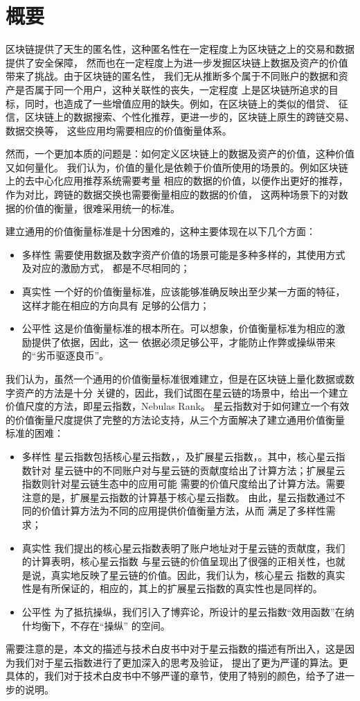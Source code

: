 \section{概要}


区块链提供了天生的匿名性，这种匿名性在一定程度上为区块链之上的交易和数据提供了安全保障，
然而也在一定程度上为进一步发掘区块链上数据及资产的价值带来了挑战。由于区块链的匿名性，
我们无从推断多个属于不同账户的数据和资产是否属于同一个用户，这种关联性的丧失，一定程度
上是区块链所追求的目标，同时，也造成了一些增值应用的缺失。例如，在区块链上的类似的借贷、
征信，区块链上的数据搜索、个性化推荐，更进一步的，区块链上原生的跨链交易、数据交换等，
这些应用均需要相应的价值衡量体系。

然而，一个更加本质的问题是：如何定义区块链上的数据及资产的价值，这种价值又如何量化。
我们认为，价值的量化是依赖于价值所使用的场景的。例如区块链上的去中心化应用推荐系统需要考量
相应的数据的价值，以便作出更好的推荐，作为对比，跨链的数据交换也需要衡量相应的数据的价值，
这两种场景下的对数据的价值的衡量，很难采用统一的标准。

建立通用的价值衡量标准是十分困难的，这种主要体现在以下几个方面：
\begin{itemize}
\item{多样性} 需要使用数据及数字资产价值的场景可能是多种多样的，其使用方式及对应的激励方式，
都是不尽相同的；
\item{真实性} 一个好的价值衡量标准，应该能够准确反映出至少某一方面的特征，这样才能在相应的方向具有
足够的公信力；
\item{公平性} 这是价值衡量标准的根本所在。可以想象，价值衡量标准为相应的激励提供了依据，因此，这一
依据必须足够公平，才能防止作弊或操纵带来的“劣币驱逐良币”。
\end{itemize}

我们认为，虽然一个通用的价值衡量标准很难建立，但是在区块链上量化数据或数字资产的方法是十分
关键的，因此，我们试图在星云链的场景中，给出一个建立价值尺度的方法，即星云指数，Nebulas Rank。
星云指数对于如何建立一个有效的价值衡量尺度提供了完整的方法论支持，从三个方面解决了建立通用价值衡量
标准的困难：
\begin{itemize}
\item{多样性} 星云指数包括核心星云指数，\nrcore，及扩展星云指数，\nrext。其中，核心星云指数针对
星云链中的不同账户对与星云链的贡献度给出了计算方法；扩展星云指数则针对星云链生态中的应用可能
需要的价值尺度给出了计算方法。需要注意的是，扩展星云指数的计算基于核心星云指数。
由此，星云指数通过不同的价值计算方法为不同的应用提供价值衡量方法，从而
满足了多样性需求；
\item{真实性} 我们提出的核心星云指数表明了账户地址对于星云链的贡献度，我们的计算表明，核心星云指数
与星云链的价值呈现出了很强的正相关性，也就是说，真实地反映了星云链的价值。因此，我们认为，核心星云
指数的真实性是有所保证的，相应的，其上的扩展星云指数的真实性也是同样的。
\item{公平性} {\color{blue} 为了抵抗操纵，我们引入了博弈论，所设计的星云指数“效用函数”在纳什均衡下，不存在“操纵”
的空间。}
\end{itemize}


需要注意的是，本文的描述与技术白皮书中对于星云指数的描述有所出入，这是因为我们对于星云指数进行了更加深入的思考及验证，
提出了更为严谨的算法。更具体的，我们对于技术白皮书中不够严谨的章节，使用了{\color{gray}特别的颜色}，给予了进一步的说明。
